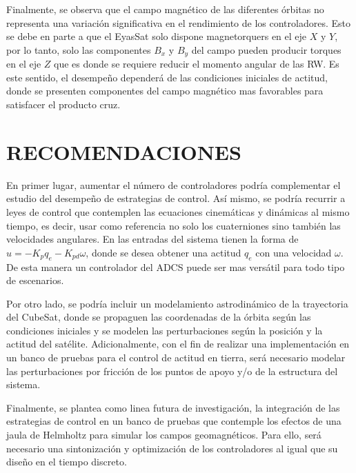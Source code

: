 Finalmente, se observa que el campo magnético de las diferentes órbitas no representa una variación significativa en el rendimiento de los controladores. Esto se debe en parte a que el EyasSat solo dispone magnetorquers en el eje $X$ y $Y$, por lo tanto, solo las componentes $B_x$ y $B_y$ del campo pueden producir torques en el eje $Z$ que es donde se requiere reducir el momento angular de las RW. Es este sentido, el desempeño dependerá de las condiciones iniciales de actitud, donde se presenten componentes del campo magnético mas favorables para satisfacer el producto cruz.


\newpage
\section{RECOMENDACIONES}



En primer lugar, aumentar el número de controladores podría complementar el estudio del desempeño de estrategias de control. Así mismo, se podría recurrir a leyes de control que contemplen las ecuaciones cinemáticas y dinámicas al mismo tiempo, es decir, usar como referencia no solo los cuaterniones sino también las velocidades angulares. En \cite{Blanke2010} las entradas del sistema tienen la forma de $u =-K_pq_e -K_{pd}\omega$, donde se desea obtener una actitud $q_e$ con una velocidad $\omega$. De esta manera un controlador del ADCS puede ser mas versátil para todo tipo de escenarios. 

Por otro lado, se podría incluir un modelamiento astrodinámico de la trayectoria del CubeSat, donde se propaguen las coordenadas de la órbita según las condiciones iniciales y se modelen las perturbaciones según la posición y la actitud del satélite. Adicionalmente, con el fin de realizar una implementación en un banco de pruebas para el control de actitud en tierra, será necesario modelar las perturbaciones por fricción de los puntos de apoyo y/o de la estructura del sistema.

Finalmente, se plantea como linea futura de investigación, la integración de las estrategias de control en un banco de pruebas que contemple los efectos de una jaula de Helmholtz para simular los campos geomagnéticos. Para ello, será necesario una sintonización y optimización de los controladores al igual que su diseño en el tiempo discreto.

